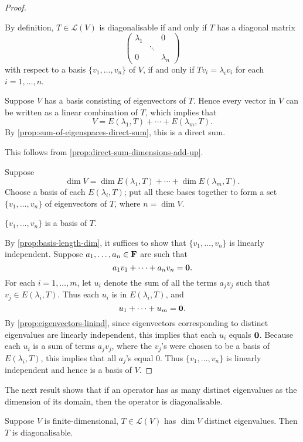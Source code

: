 \begin{proof} \

 By definition, $T\in\mathcal{L}(V)$ is diagonalisable if and only if $T$ has a diagonal matrix
\[\begin{pmatrix}
\lambda_1&&0\\
&\ddots&\\
0&&\lambda_n
\end{pmatrix}\]
with respect to a basis $\{v_1,\dots,v_n\}$ of $V$, if and only if $Tv_i=\lambda_i v_i$ for each $i=1,\dots,n$.

 Suppose $V$ has a basis consisting of eigenvectors of $T$.
Hence every vector in $V$ can be written as a linear combination of $T$, which implies that
\[V=E(\lambda_1,T)+\cdots+E(\lambda_m,T).\]
By \ref{prop:sum-of-eigenspaces-direct-sum}, this is a direct sum.

 This follows from \ref{prop:direct-sum-dimensions-add-up}.

 Suppose
\[\dim V=\dim E(\lambda_1,T)+\cdots+\dim E(\lambda_m,T).\]
Choose a basis of each $E(\lambda_i,T)$; put all these bases together to form a set $\{v_1,\dots,v_n\}$ of eigenvectors of $T$, where $n=\dim V$.
\begin{claim}
$\{v_1,\dots,v_n\}$ is a basis of $T$.
\end{claim}
By \ref{prop:basis-length-dim}, it suffices to show that $\{v_1,\dots,v_n\}$ is linearly independent. Suppose $a_1,\dots,a_n\in\mathbf F$ are such that
\[a_1v_1+\cdots+a_nv_n=\vb{0}.\]
For each $i=1,\dots,m$, let $u_i$ denote the sum of all the terms $a_j v_j$ such that $v_j\in E(\lambda_i,T)$. Thus each $u_i$ is in $E(\lambda_i,T)$, and
\[u_1+\cdots+u_m=\vb{0}.\]
By \ref{prop:eigenvectors-linind}, since eigenvectors corresponding to distinct eigenvalues are linearly independent, this implies that each $u_i$ equals $\vb{0}$. Because each $u_i$ is a sum of terms $a_jv_j$, where the $v_j$'s were chosen to be a basis of $E(\lambda_i,T)$, this implies that all $a_j$'s equal $0$. Thus $\{v_1,\dots,v_n\}$ is linearly independent and hence is a basis of $V$.
\end{proof}

The next result shows that if an operator has as many distinct eigenvalues as the dimension of its domain, then the operator is diagonalisable.

\begin{corollary}
Suppose $V$ is finite-dimensional, $T\in\mathcal{L}(V)$ has $\dim V$ distinct eigenvalues. Then $T$ is diagonalisable.
\end{corollary}

